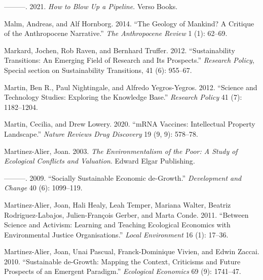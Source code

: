 \documentclass[a4paper, nobind]{templates/ociamthesis}
\newlength{\cslhangindent}
\newenvironment{CSLReferences}[2] %
 {%
  \setlength{\parindent}{0pt}
  \ifodd #1
  \let\oldpar\par
  \def\par{\hangindent=\cslhangindent\oldpar}
  \fi
  \setlength{\parskip}{1mm}
  \setlength{\baselineskip}{6mm}
 }%
 {}
\begin{document}
\begin{CSLReferences}{1}{0}
\leavevmode{}%
---------. 2021. \emph{How to {Blow Up} a {Pipeline}}. {Verso Books}.

\leavevmode{}%
Malm, Andreas, and Alf Hornborg. 2014. {``The Geology of Mankind? {A} Critique of the {Anthropocene} Narrative.''} \emph{The Anthropocene Review} 1 (1): 62--69.

\leavevmode{}%
Markard, Jochen, Rob Raven, and Bernhard Truffer. 2012. {``Sustainability Transitions: {An} Emerging Field of Research and Its Prospects.''} \emph{Research Policy}, Special {section} on {Sustainability Transitions}, 41 (6): 955--67.

\leavevmode{}%
Martin, Ben R., Paul Nightingale, and Alfredo Yegros-Yegros. 2012. {``Science and Technology Studies: {Exploring} the Knowledge Base.''} \emph{Research Policy} 41 (7): 1182--1204.

\leavevmode{}%
Martin, Cecilia, and Drew Lowery. 2020. {``{mRNA} Vaccines: Intellectual Property Landscape.''} \emph{Nature Reviews Drug Discovery} 19 (9, 9): 578--78.

\leavevmode{}%
Martinez-Alier, Joan. 2003. \emph{The {Environmentalism} of the {Poor}: {A Study} of {Ecological Conflicts} and {Valuation}}. {Edward Elgar Publishing}.

\leavevmode{}%
---------. 2009. {``Socially Sustainable Economic de-Growth.''} \emph{Development and Change} 40 (6): 1099--119.

\leavevmode{}%
Martinez-Alier, Joan, Hali Healy, Leah Temper, Mariana Walter, Beatriz Rodriguez-Labajos, Julien-François Gerber, and Marta Conde. 2011. {``Between Science and Activism: Learning and Teaching Ecological Economics with Environmental Justice Organisations.''} \emph{Local Environment} 16 (1): 17--36.

\leavevmode{}%
Martinez-Alier, Joan, Unai Pascual, Franck-Dominique Vivien, and Edwin Zaccai. 2010. {``Sustainable de-Growth: {Mapping} the Context, Criticisms and Future Prospects of an Emergent Paradigm.''} \emph{Ecological Economics} 69 (9): 1741--47.


\end{CSLReferences}
\end{document}
